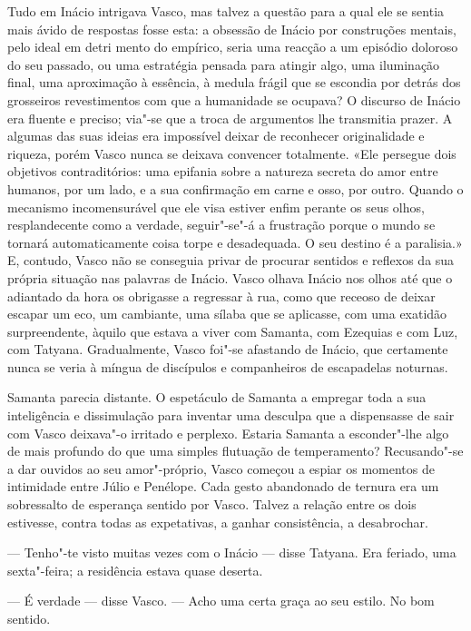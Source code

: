 Tudo em Inácio intrigava Vasco, mas talvez a questão para a qual ele se
sentia mais ávido de respostas fosse esta: a obsessão de Inácio por
construções mentais, pelo ideal em detri
mento do empírico, seria uma reacção a um episódio doloroso do seu
passado, ou uma estratégia pensada para atingir algo, uma iluminação
final, uma aproximação à essência, à medula frágil que se escondia por
detrás dos grosseiros revestimentos com que a humanidade se ocupava? O
discurso de Inácio era fluente e preciso; via"-se que a troca de
argumentos lhe transmitia prazer. A algumas das suas ideias era
impossível deixar de reconhecer originalidade e riqueza, porém Vasco
nunca se deixava convencer totalmente. «Ele persegue dois objetivos
contraditórios: uma epifania sobre a natureza secreta do amor entre
humanos, por um lado, e a sua confirmação em carne e osso, por outro.
Quando o mecanismo incomensurável que ele visa estiver enfim perante os
seus olhos, resplandecente como a verdade, seguir"-se"-á a frustração
porque o mundo se tornará automaticamente coisa torpe e desadequada. O
seu destino é a paralisia.» E, contudo, Vasco não se conseguia privar de
procurar sentidos e reflexos da sua própria situação nas palavras de
Inácio. Vasco olhava Inácio nos olhos até que o adiantado da hora os
obrigasse a regressar à rua, como que receoso de deixar escapar um eco,
um cambiante, uma sílaba que se aplicasse, com uma exatidão
surpreendente, àquilo que estava a viver com Samanta, com Ezequias e com
Luz, com Tatyana. Gradualmente, Vasco foi"-se afastando de Inácio, que
certamente nunca se veria à míngua de discípulos e companheiros de
escapadelas noturnas.

Samanta parecia distante. O espetáculo de Samanta a
empregar toda a sua inteligência e dissimulação para inventar uma
desculpa que a dispensasse de sair com Vasco deixava"-o irritado e
perplexo. Estaria Samanta a esconder"-lhe algo de mais profundo do que
uma simples flutuação de temperamento? Recusando"-se a dar ouvidos ao
seu amor"-próprio, Vasco começou a espiar os momentos de intimidade entre Júlio e Penélope. Cada
gesto abandonado de ternura era um sobressalto de esperança sentido
por Vasco. Talvez a relação entre os dois estivesse, contra todas as
expetativas, a ganhar consistência, a desabrochar.

--- Tenho"-te visto muitas vezes com o Inácio --- disse Tatyana. Era
  feriado, uma sexta"-feira; a residência estava quase deserta.

--- É verdade --- disse Vasco. --- Acho uma certa graça ao seu estilo. No
  bom sentido.

